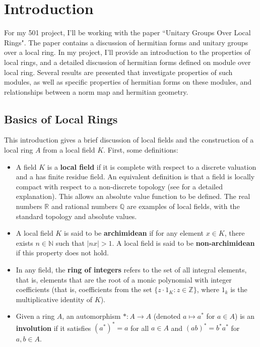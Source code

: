 \section{Introduction}

For my 501 project, I'll be working with the paper ``Unitary Groups Over Local Rings"\cite{cruickshank}.
The paper contains a discussion of hermitian forms and unitary groups over a local ring.
In my project, I'll provide an introduction to the properties of local rings, and a detailed discussion of hermitian forms
defined on module over local ring.
Several results are presented that investigate properties of such modules, as well as specific properties of hermitian forms on these modules,
and relationships between a norm map and hermitian geometry.

\subsection{Basics of Local Rings}

This introduction gives a brief discussion of local fields and the construction of a local ring $A$ from a local field $K$.
First, some definitions:

\begin{itemize}
\item A field $K$ is a \textbf{local field} if it is complete with respect to a discrete valuation and a has finite residue field.
An equivalent definition is that a field is locally compact with respect to a non-discrete topology (see \cite{serre} for a detailed explanation).
This allows an absolute value function to be defined.
The real numbers $\mathbb{R}$ and rational numbers $\mathbb{Q}$ are examples of local fields, with the standard topology and absolute values.
\item A local field $K$ is said to be \textbf{archimidean} if for any element $x \in K$, there exists $n \in \mathbb{N}$ such that $|nx| > 1$.
A local field is said to be \textbf{non-archimidean} if this property does not hold.
\item In any field, the \textbf{ring of integers} refers to the set of all integral elements, that is, 
elements that are the root of a monic polynomial with integer coefficients 
(that is, coefficients from the set $\{z \cdot 1_K : z \in \mathbb{Z} \}$, where $1_k$ is the multiplicative identity of $K$).
\item Given a ring $A$, an automorphism $*: A \to A$ (denoted $a \mapsto a^*$ for $a \in A$) is an \textbf{involution} 
if it satisfies $(a^*)^* = a$ for all $a \in A$ and $(ab)^* = b^* a^*$ for $a, b \in A$.
\end{itemize}

